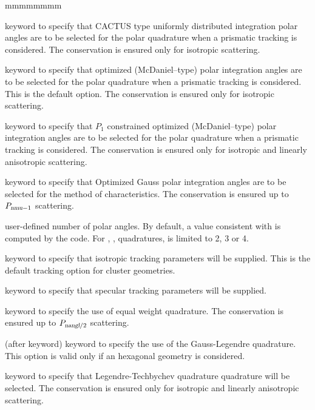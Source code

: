 \begin{ListeDeDescription}{mmmmmmmm}
\item[\moc{CACB}] keyword to specify that CACTUS type uniformly distributed integration polar angles
are to be selected for the polar quadrature when a prismatic tracking is considered.\cite{CACTUS} The conservation is ensured only for isotropic scattering.

\item[\moc{LCMD}] keyword to specify that optimized (McDaniel--type) polar integration angles are to be
selected for the polar quadrature when a prismatic tracking is considered.\cite{LCMD} This is the default option. The conservation is ensured only for isotropic scattering.

\item[\moc{OPP1}] keyword to specify that $P_1$ constrained optimized (McDaniel--type) polar integration angles are to be selected for the polar quadrature when a prismatic tracking is considered.\cite{LeTellierpa} The conservation is ensured only for isotropic and linearly anisotropic scattering.

\item[\moc{OGAU}] keyword to specify that Optimized Gauss polar integration angles are to be
selected for the method of characteristics.\cite{LCMD,LeTellierpa} The conservation is ensured up to $P_{\dusa{nmu}-1}$ scattering.

\item[\dusa{nmu}]  user-defined number of polar angles. By default, a value consistent with  is computed by the code. For , ,  quadratures,  is limited to 2, 3 or 4.

\item[\moc{TISO}] keyword to specify that isotropic tracking parameters will be supplied. This is the
default tracking option for cluster geometries. 

\item[\moc{TSPC}] keyword to specify that specular tracking parameters will be
supplied.

\item[\moc{EQW}] keyword to specify the use of equal weight quadrature.\cite{eqn} The conservation is ensured up to $P_{\dusa{nangl}/2}$ scattering.

\item[\moc{GAUS}] (after  keyword) keyword to specify the use of the Gauss-Legendre quadrature. This option is valid only if an 
hexagonal geometry is considered.

\item[\moc{PNTN}] keyword to specify that Legendre-Techbychev quadrature quadrature will be selected.\cite{pntn} The conservation is ensured only for isotropic and linearly anisotropic scattering.


\end{ListeDeDescription}
